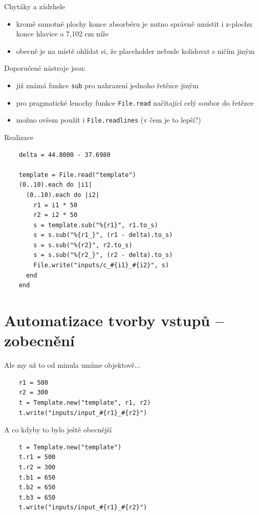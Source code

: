 \documentclass{beamer}
\begin{document}
\begin{frame}{Chytáky a zádrhele}
  \begin{itemize}
    \item kromě samotné plochy konce absorbéru je nutno správně umístit i z-plochu konce hlavice o 7,102 cm níže
    \item obecně je na místě ohlídat si, že placeholder nebude kolidovat s ničím jiným
  \end{itemize}
  Doporučené nástroje jsou:
  \begin{itemize}
    \item již známá funkce \texttt{sub} pro nahrazení jednoho řetězce jiným
    \item pro pragmatické lenochy funkce \texttt{File.read} načítající celý soubor do řetězce
    \item možno ovšem použít i \texttt{File.readlines} (v čem je to lepší?)
  \end{itemize}
\end{frame}

\begin{frame}[fragile]{Realizace}
  \scriptsize
  \begin{verbatim}
    delta = 44.8000 - 37.6980

    template = File.read("template")
    (0..10).each do |i1|
      (0..10).each do |i2|
        r1 = i1 * 50
        r2 = i2 * 50
        s = template.sub("%{r1}", r1.to_s)
        s = s.sub("%{r1_}", (r1 - delta).to_s)
        s = s.sub("%{r2}", r2.to_s)
        s = s.sub("%{r2_}", (r2 - delta).to_s)
        File.write("inputs/c_#{i1}_#{i2}", s)
      end
    end
  \end{verbatim}
\end{frame}

\section{Automatizace tvorby vstupů -- zobecnění}

\begin{frame}[fragile]{Ale my už to od minula umíme objektově...}
  \scriptsize
  \begin{verbatim}
    r1 = 500
    r2 = 300
    t = Template.new("template", r1, r2)
    t.write("inputs/input_#{r1}_#{r2}")
  \end{verbatim}
\end{frame}

\begin{frame}[fragile]{A co kdyby to bylo ještě obecnější}
  \scriptsize
  \begin{verbatim}
    t = Template.new("template")
    t.r1 = 500
    t.r2 = 300
    t.b1 = 650
    t.b2 = 650
    t.b3 = 650
    t.write("inputs/input_#{r1}_#{r2}")
  \end{verbatim}
\end{frame}
\end{document}

